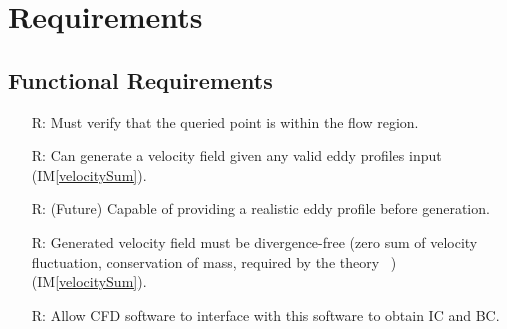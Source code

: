 \documentclass[12pt]{article}
\newcommand{\iref}[1]{IM\ref{#1}}
\newcounter{reqnum} %
\begin{document}
\section{Requirements} \label{Sec_req}



\subsection{Functional Requirements}

\noindent \begin{itemize}

\item[R\refstepcounter{reqnum}\thereqnum \label{R_inputs}:] Must verify that the queried point is within the flow region.


\item[R\refstepcounter{reqnum}\thereqnum \label{R_anyEddy}:] Can generate a velocity field given any valid eddy profiles input (\iref{velocitySum}).
\item[R\refstepcounter{reqnum}\thereqnum \label{R_realEddy}:] (Future) Capable of providing a realistic eddy profile before generation.

\item[R\refstepcounter{reqnum}\thereqnum \label{R_zeroSum}:] Generated velocity field must be divergence-free (zero sum of velocity fluctuation, conservation of mass, required by the theory ~\citet{PolettoEtAl2013}) (\iref{velocitySum}).

\item[R\refstepcounter{reqnum}\thereqnum \label{R_CFD}:] Allow CFD software to interface with this software to obtain IC and BC.


\end{itemize}
\end{document}
